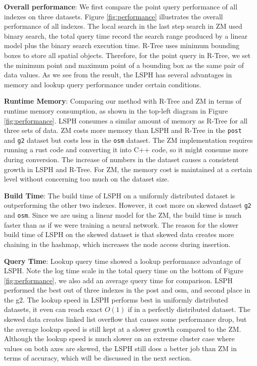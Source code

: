\textbf{Overall performance}: We first compare the point query performance of all indexes on three datasets. Figure \ref{fig:performance} illustrates the overall performance of all indexes. The local search in the last step search in ZM used binary search, the total query time record the search range produced by a linear model plus the binary search execution time.  R-Tree uses minimum  bounding boxes to store all spatial objects. Therefore, for the point query in R-Tree, we set the minimum point and maximum point of a bounding box as the same pair of data values. As we see from the result, the LSPH has several advantages in memory and lookup query performance under certain conditions. 


\textbf{Runtime Memory}:
Comparing our method with R-Tree and ZM in terms of runtime memory consumption, as shown in the top-left diagram in Figure \ref{fig:performance}. LSPH consumes a similar amount of memory as R-Tree for all three sets of data. ZM costs more memory than LSPH and R-Tree in the \texttt{post} and \texttt{g2} dataset but costs less in the \texttt{osm} dataset. The ZM implementation requires running a rust code and converting it into C++ code, so it might consume more during conversion. The increase of numbers in the dataset causes a consistent growth in LSPH and R-Tree. For ZM, the memory cost is maintained at a certain level without concerning too much on the dataset size. 


\textbf{Build Time}: The build time of LSPH on a uniformly distributed dataset is outperforming the other two indexes. However, it cost more on skewed dataset \texttt{g2} and \texttt{osm}. Since we are using a linear model for the ZM, the build time is much faster than as if we were training a neural network. The reason for the slower build time of LSPH on the skewed dataset is that skewed data creates more chaining in the hashmap, which increases the node access during insertion. 



\textbf{Query Time}: Lookup query time showed a lookup performance advantage of LSPH. Note the log time scale in the total query time on the bottom of Figure \ref{fig:performance}, we also add an average query time for comparison. LSPH performed the best out of three indexes in the post and osm, and second place in the g2. The lookup speed in LSPH performs best in uniformly distributed datasets, it even can reach exact $O(1)$ if in a perfectly distributed dataset. The skewed data creates linked list overflow that causes some performance drop, but the average lookup speed is still kept at a slower growth compared to the ZM.  Although the lookup speed is much slower on an extreme cluster case where values on both axes are skewed, the LSPH still does a better job than ZM in terms of accuracy, which will be discussed in the next section.



